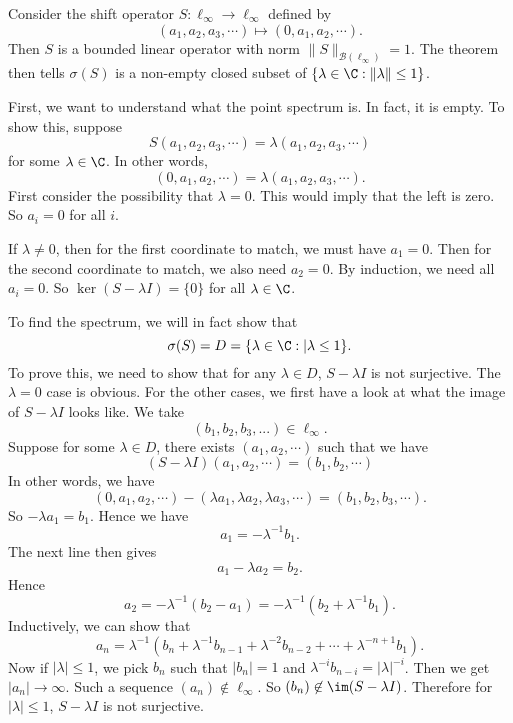 \documentclass[a4paper]{article}
\begin{document}
\begin{eg}
  Consider the shift operator $S: \ell_\infty \to \ell_\infty$ defined by
  \[
    (a_1, a_2, a_3, \cdots) \mapsto (0, a_1, a_2, \cdots).
  \]
  Then $S$ is a bounded linear operator with norm $\|S\|_{\mathcal{B}(\ell_\infty)} = 1$. The theorem then tells $\sigma(S)$ is a non-empty closed subset of $\{\lambda \in \C: \|\lambda\| \leq 1\}$.

  First, we want to understand what the point spectrum is. In fact, it is empty. To show this, suppose
  \[
    S(a_1, a_2, a_3, \cdots) = \lambda (a_1, a_2, a_3, \cdots)
  \]
  for some $\lambda \in \C$. In other words,
  \[
    (0, a_1, a_2, \cdots) = \lambda (a_1, a_2, a_3, \cdots).
  \]
  First consider the possibility that $\lambda = 0$. This would imply that the left is zero. So $a_i = 0$ for all $i$.

  If $\lambda \not= 0$, then for the first coordinate to match, we must have $a_1 = 0$. Then for the second coordinate to match, we also need $a_2 = 0$. By induction, we need all $a_i = 0$. So $\ker (S - \lambda I) = \{0\}$ for all $\lambda \in \C$.

  To find the spectrum, we will in fact show that
  \[
    \sigma(S) = D = \{\lambda \in \C: |\lambda \leq 1\}.
  \]
  To prove this, we need to show that for any $\lambda \in D$, $S - \lambda I$ is not surjective. The $\lambda = 0$ case is obvious. For the other cases, we first have a look at what the image of $S - \lambda I$ looks like. We take
  \[
    (b_1, b_2, b_3, ...) \in \ell_\infty.
  \]
  Suppose for some $\lambda \in D$, there exists $(a_1, a_2, \cdots)$ such that we have
  \[
    (S - \lambda I) (a_1, a_2, \cdots) = (b_1, b_2, \cdots)
  \]
   In other words, we have
  \[
    (0, a_1, a_2, \cdots) - (\lambda a_1, \lambda a_2, \lambda a_3, \cdots) = (b_1, b_2, b_3, \cdots).
  \]
  So $-\lambda a_1 = b_1$. Hence we have
  \[
    a_1 = -\lambda^{-1} b_1.
  \]
  The next line then gives
  \[
    a_1 - \lambda a_2 = b_2.
  \]
  Hence
  \[
    a_2 = -\lambda^{-1}(b_2 - a_1) = -\lambda^{-1} (b_2 + \lambda^{-1} b_1).
  \]
  Inductively, we can show that
  \[
    a_n = \lambda^{-1}(b_n + \lambda^{-1} b_{n - 1} + \lambda^{-2}b_{n - 2} + \cdots + \lambda^{-n + 1}b_1).
  \]
  Now if $|\lambda| \leq 1$, we pick $b_n$ such that $|b_n| = 1$ and $\lambda^{-i}b_{n - i} = |\lambda|^{-i}$. Then we get $|a_n| \to \infty$. Such a sequence $(a_n) \not\in \ell_\infty$. So $(b_n) \not\in \im (S - \lambda I)$. Therefore for $|\lambda| \leq 1$, $S - \lambda I$ is not surjective.


\end{eg}
\end{document}

